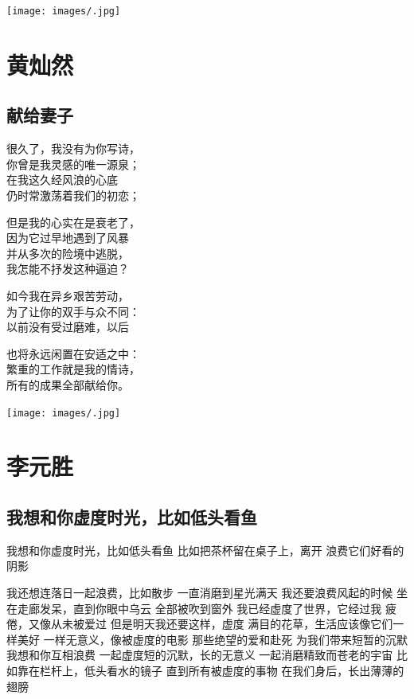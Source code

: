 \documentclass[
]{book}
\renewenvironment{quote}{\begin{VF}}{\end{VF}}
\begin{document}
\texttt{[image: images/.jpg]}

\hypertarget{section-27}{%
\chapter{黄灿然}\label{section-27}}

\hypertarget{section-28}{%
\section{献给妻子}\label{section-28}}

\begin{quote}
很久了，我没有为你写诗，\\
你曾是我灵感的唯一源泉；\\
在我这久经风浪的心底\\
仍时常激荡着我们的初恋；

但是我的心实在是衰老了，\\
因为它过早地遇到了风暴\\
并从多次的险境中逃脱，\\
我怎能不抒发这种逼迫？

如今我在异乡艰苦劳动，\\
为了让你的双手与众不同：\\
以前没有受过磨难，以后

也将永远闲置在安适之中：\\
繁重的工作就是我的情诗，\\
所有的成果全部献给你。
\end{quote}

\texttt{[image: images/.jpg]}

\hypertarget{section-29}{%
\chapter{李元胜}\label{section-29}}

\hypertarget{section-30}{%
\section{我想和你虚度时光，比如低头看鱼}\label{section-30}}

\begin{quote}
我想和你虚度时光，比如低头看鱼
比如把茶杯留在桌子上，离开
浪费它们好看的阴影

我还想连落日一起浪费，比如散步
一直消磨到星光满天
我还要浪费风起的时候
坐在走廊发呆，直到你眼中乌云
全部被吹到窗外
我已经虚度了世界，它经过我
疲倦，又像从未被爱过
但是明天我还要这样，虚度
满目的花草，生活应该像它们一样美好
一样无意义，像被虚度的电影
那些绝望的爱和赴死
为我们带来短暂的沉默
我想和你互相浪费
一起虚度短的沉默，长的无意义
一起消磨精致而苍老的宇宙
比如靠在栏杆上，低头看水的镜子
直到所有被虚度的事物
在我们身后，长出薄薄的翅膀
\end{quote}
\end{document}
